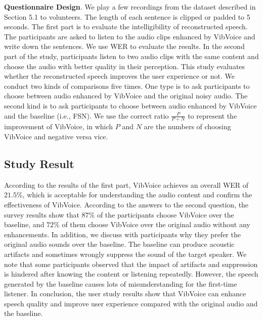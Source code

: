 \noindent\textbf{Questionnaire Design}.
We play a few recordings from the dataset described in Section 5.1 to volunteers. The length of each sentence is clipped or padded to 5 seconds.
The first part is to evaluate the intelligibility of reconstructed speech. The participants are asked to listen to the audio clips enhanced by VibVoice and write down the sentences. We use WER to evaluate the results.
In the second part of the study, participants listen to two audio clips with the same content and choose the audio with better quality in their perception. This study evaluates whether the reconstructed speech improves the user experience or not.
We conduct two kinds of comparisons five times. One type is to ask participants to choose between audio enhanced by VibVoice and the original noisy audio. The second kind is to ask participants to choose between audio enhanced by VibVoice and the baseline (i.e., FSN). We use the correct ratio $\frac{P}{P+N}$ to represent the improvement of VibVoice, in which $P$ and $N$ are the numbers of choosing VibVoice and negative versa vice.


\subsection{Study Result}
According to the results of the first part, VibVoice achieves an overall WER of $21.5\%$, which is acceptable for understanding the audio content and confirm the effectiveness of VibVoice.
According to the answers to the second question, the survey results show that $87\%$ of the participants choose VibVoice over the baseline, and $72\%$ of them choose VibVoice over the original audio without any enhancements.
In addition, we discuss with participants why they prefer the original audio sounds over the baseline. 
The baseline can produce acoustic artifacts and sometimes wrongly suppress the sound of the target speaker. We note that some participants observed that the impact of artifacts and suppression is hindered after knowing the content or listening repeatedly. However, the speech generated by the baseline causes lots of misunderstanding for the first-time listener. In conclusion, the user study results show that VibVoice can enhance speech quality and improve user experience compared with the original audio and the baseline.